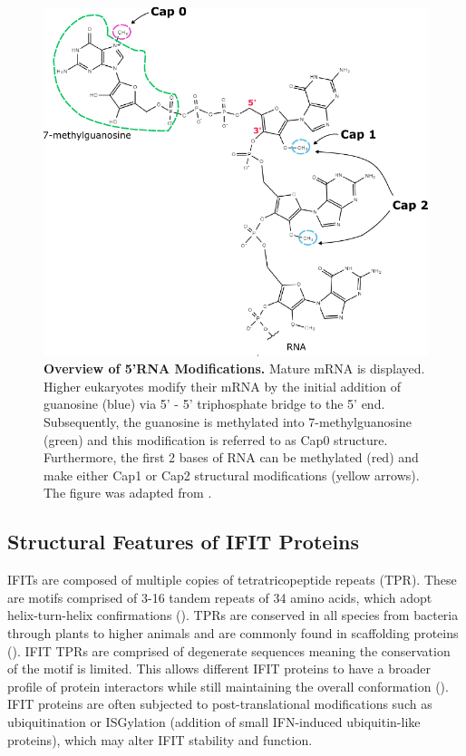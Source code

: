 \begin{figure}
    \centering
    \includegraphics[width=0.75\linewidth]{04. Introduction//Figs/02. 5-RNA Modifications.pdf}
    \caption[Overview of 5'RNA Modifications.]{\textbf{Overview of 5'RNA Modifications.} Mature mRNA is displayed. Higher eukaryotes modify their mRNA by the initial addition of guanosine (blue) via 5' - 5' triphosphate bridge to the 5' end. Subsequently, the guanosine is methylated into 7-methylguanosine (green) and this modification is referred to as Cap0 structure. Furthermore, the first 2 bases of RNA can be methylated (red) and make either Cap1 or Cap2 structural modifications (yellow arrows). The figure was adapted from \cite{Picard-Jean2013RNAGenomes}.}
    \label{fig:Overview of 5'RNA Modifications.}
\end{figure}

\subsection{Structural Features of IFIT Proteins} \label{subsec:Structural Features of IFIT Proteins}
IFITs are composed of multiple copies of tetratricopeptide repeats (TPR). These are motifs comprised of 3-16 tandem repeats of 34 amino acids, which adopt helix-turn-helix confirmations (\cite{DAndrea2003TPRHelix}). TPRs are conserved in all species from bacteria through plants to higher animals and are commonly found in scaffolding proteins (\cite{Vladimer2014IFITs:Proteins}). IFIT TPRs are comprised of degenerate sequences meaning the conservation of the motif is limited. This allows different IFIT proteins to have a broader profile of protein interactors while still maintaining the overall conformation (\cite{Fensterl2015Interferon-InducedPathogenesis}). IFIT proteins are often subjected to post-translational modifications such as ubiquitination or ISGylation (addition of small IFN-induced ubiquitin-like proteins), which may alter IFIT stability and function.

